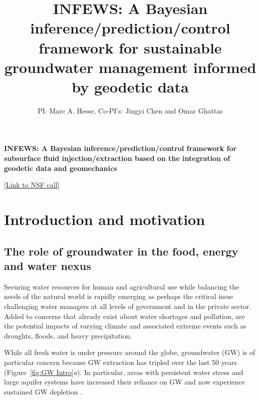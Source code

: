 \documentclass[11pt,final]{article}%
\title{INFEWS: A Bayesian inference/prediction/control framework for sustainable groundwater management informed by geodetic data}
\author{PI: Marc A. Hesse, Co-PI's: Jingyi Chen and Omar Ghattas}
\begin{document}
\maketitle


\tableofcontents
{}

\newpage




\begin{center}
{\large \bf
INFEWS: A Bayesian inference/prediction/control framework for subsurface fluid injection/extraction based on the integration of geodetic data and geomechanics}
\end{center}

\href{https://www.nsf.gov/funding/pgm_summ.jsp?pims_id=505241}{[Link to NSF call]}

\section{Introduction and motivation}

\subsection{The role of groundwater in the food, energy and water nexus}
Securing water resources for human and agricultural use while balancing the needs of the natural world is rapidly emerging as perhaps the critical issue challenging water managers at all levels of government and in the private sector. Added to concerns that already exist about water shortages and pollution, are the potential impacts of varying climate and associated extreme events such as droughts, floods, and heavy precipitation. 

While all fresh water is under pressure around the globe, groundwater (GW) is of particular concern because GW extraction has tripled over the last 50 years (Figure~\ref{fig:GW Intro}\emph{a}). In particular, areas with persistent water stress and large aquifer systems have increased their reliance on GW and now experience sustained GW depletion \cite{Hanasaki2008,Wada2010,Scanlon2012}.
\end{document}
